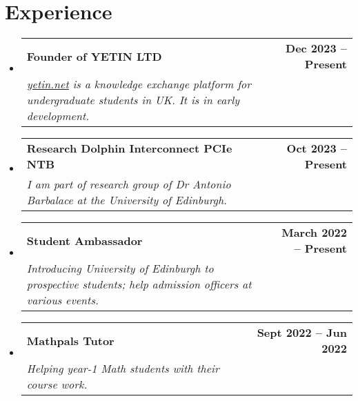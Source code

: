 \documentclass[letterpaper,11pt]{article}
\makeatletter
\newcommand{\resumeSubheading}[4]{
  \vspace{-2pt}\item
    \begin{tabular*}{1.0\textwidth}[t]{l@{\extracolsep{\fill}}r}
      \textbf{#1} & \textbf{\small #2} \\
      \textit{\small#3} & \textit{\small #4} \\
    \end{tabular*}\vspace{-7pt}
}
\newcommand{\resumeSubHeadingListStart}{\begin{itemize}[leftmargin=0.0in, label={}]}
\newcommand{\resumeSubHeadingListEnd}{\end{itemize}}
\makeatother
\begin{document}


\section{Experience}
  \resumeSubHeadingListStart
    \resumeSubheading
	{Founder of YETIN LTD}{Dec 2023 -- Present}
	{\href{https://yetin.net}{\underline{yetin.net}} is a knowledge exchange platform for undergraduate students in UK. It is in early development.}{}
    \resumeSubheading
	{Research Dolphin Interconnect PCIe NTB}{Oct 2023 -- Present}
	{I am part of research group of Dr Antonio Barbalace at the University of Edinburgh.}{}
    \resumeSubheading
      {Student Ambassador}{March 2022 -- Present}
      {Introducing University of Edinburgh to prospective students; help admission officers at various events.}{}
    \resumeSubheading
      {Mathpals Tutor}{Sept 2022 -- Jun 2022}
      {Helping year-1 Math students with their course work.}{}
  \resumeSubHeadingListEnd
\end{document}
